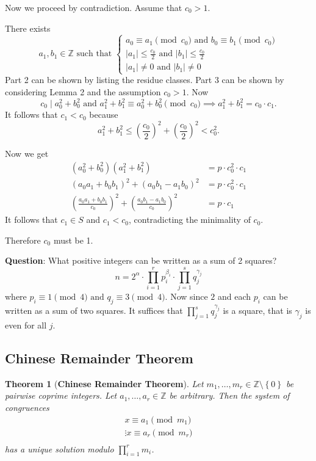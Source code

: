 \documentclass[11pt]{article}
\newtheorem{thm}{Theorem}[section]
\theoremstyle{definition}
\newcommand{\sm}[0]{\setminus}
\newcommand{\set}[1]{\left\{ #1 \right\}}
\newcommand{\nl}[0]{\vspace{12pt}}
\newcommand{\srng}[3]{#1_#2,\dots,#1_#3}
\newcommand{\st}[0]{\text{ such that }}
\newcommand{\et}[0]{\text{ and }}
\newcommand{\abs}[1]{\left\lvert#1\right\rvert} %
\newcommand{\ZZ}{\mathbb{Z}}
\begin{document}
Now we proceed by contradiction. Assume that $c_0 > 1$. 

There exists 
$$ a_1,b_1\in\ZZ \st \begin{cases}
	a_0 \equiv a_1 \pmod{c_0} \et b_0 \equiv b_1 \pmod{c_0} \\
	\abs{a_1} \le \frac{c_0}{2} \et \abs{b_1}\le\frac{c_0}{2} \\
	\abs{a_1}\neq 0 \et \abs{b_1}\neq 0
	\end{cases}
$$
Part 2 can be shown by listing the residue classes. Part 3 can be shown by considering Lemma 2 and the assumption $c_0 > 1$.
Now 
$$ c_0 \mid a_0^2 + b_0^2 \et a_1^2 + b_1^2 \equiv a_0^2 + b_0^2 \pmod{c_0} \implies a_1^2 + b_1^2 = c_0 \cdot c_1. $$
It follows that $c_1 < c_0$ because 
$$ a_1^2+b_1^2 \le \left(\frac{c_0}{2}\right)^2 + \left(\frac{c_0}{2}\right)^2 < c_0^2. $$ 

Now we get 
\begin{align*} 
	(a_0^2 + b_0^2)(a_1^2 + b_1^2) &= p\cdot c_0^2 \cdot c_1 \\
	(a_0a_1 + b_0b_1)^2 + (a_0b_1 - a_1b_0)^2 &= p\cdot c_0^2 \cdot c_1 \\
	\left(\frac{a_0a_1 + b_0b_1}{c_0}\right)^2 + \left(\frac{a_0b_1 - a_1b_0}{c_0}\right)^2 &= p\cdot c_1
\end{align*}
It follows that $c_1\in S$ and $c_1 < c_0$, contradicting the minimality of $c_0$. 

Therefore $c_0$ must be 1.
\qedhere\nl

\noindent\textbf{Question}: What positive integers can be written as a sum of 2 squares?
$$ n = 2^\alpha \cdot \prod_{i=1}^{r} p_i^{\beta_i} \cdot \prod_{j=1}^{s} q_j^{\gamma_j} $$
where $p_i \equiv 1 \pmod{4} \et q_j \equiv 3 \pmod{4}$. 
Now since $2$ and each $p_i$ can be written as a sum of two squares. It suffices that $\prod_{j=1}^{s} q_j^{\gamma_j}$ is a square, that is $\gamma_j$ is even for all $j$. 


\subsection{Chinese Remainder Theorem}
\begin{thm}[\textbf{Chinese Remainder Theorem}]
Let $\srng{m}{1}{r}\in\ZZ\sm\set{0}$ be pairwise coprime integers. Let $\srng{a}{1}{r}\in\ZZ$ be arbitrary. Then the system of congruences
\begin{align*}
	x \equiv a_1 \pmod{m_1} \\
	\vdots
	x \equiv a_r \pmod{m_r} \\
\end{align*}
has a unique solution modulo $\prod_{i=1}^{r}m_i$. 
\end{thm}
\end{document}
